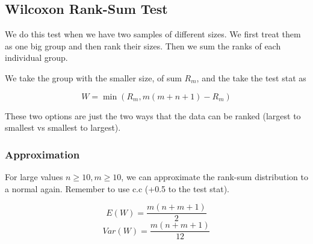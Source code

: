 \documentclass{article}
\theoremstyle{mytheoremstyle}
\theoremstyle{mytheoremstyle}
\theoremstyle{myproblemstyle}
\begin{document}
    \subsection{Wilcoxon Rank-Sum Test}

    We do this test when we have two samples of different sizes. We first treat them as one big group and then rank their sizes. Then we sum the ranks of each individual group. 

    We take the group with the smaller size, of sum $R_m$, and the take the test stat as

    \begin{definition}
        \[W = \min(R_m, m(m + n + 1) - R_m)\]
    \end{definition}

    These two options are just the two ways that the data can be ranked (largest to smallest vs smallest to largest).

    \subsubsection{Approximation}
    For large values $n \geq 10, m \geq 10$, we can approximate the rank-sum distribution to a normal again. Remember to use c.c (+0.5 to the test stat).

    \begin{theorem}

        \[E(W) = \frac{m(n+m+1)}{2}\]
        \[Var(W) = \frac{m(n+m+1)}{12}\]
        
    \end{theorem}


    
\end{document}
